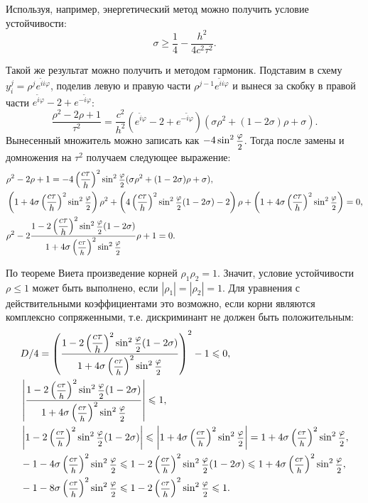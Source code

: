 \documentclass[12pt, a4paper]{article}
\begin{document}
\begin{enumerate}
	Используя, например, энергетический метод можно получить условие устойчивости\cite{galanin}:
	\[
	\sigma \ge \frac14 - \frac{h^2}{4 c^2 \tau^2}.
	\]
	
	Такой же результат можно получить и методом гармоник. Подставим в схему $y_i^j = \rho^j e^{\tilde i i \varphi}$, поделив левую и правую части $\rho^{j-1} e^{\tilde i i \varphi}$ и вынеся за скобку в правой части $e^{\tilde i \varphi} -2 + e^{-\tilde i \varphi}$:
	\[
	\dfrac{\rho^2 -2\rho + 1}{\tau^2} = \dfrac{c^2}{h^2}(e^{\tilde i \varphi} -2 + e^{-\tilde i \varphi}) (\sigma \rho^2 + (1-2\sigma)\rho+\sigma).
	\]
	Вынесенный множитель можно записать как $-4\sin^2\hbox{\footnotesize$\displaystyle\frac{\varphi}{2}$}$. Тогда после замены и домножения на $\tau^2$ получаем следующее выражение:
	\begin{eqnarray*}
		&\rho^2 -2\rho + 1 = -4 \left(\dfrac{c \tau}{h}\right)^2 \sin^2\hbox{\footnotesize$\displaystyle\frac{\varphi}{2}$} (\sigma \rho^2 + (1-2\sigma)\rho+\sigma),\\
		& \left(1+4\sigma\left(\dfrac{c \tau}{h}\right)^2 \sin^2\hbox{\footnotesize$\displaystyle\frac{\varphi}{2}$}\right)\rho^2 + \left(4 \left(\dfrac{c \tau}{h}\right)^2 \sin^2\hbox{\footnotesize$\displaystyle\frac{\varphi}{2}$}(1-2\sigma) - 2\right) \rho + \left(1+4\sigma\left(\dfrac{c \tau}{h}\right)^2 \sin^2\hbox{\footnotesize$\displaystyle\frac{\varphi}{2}$}\right) = 0,\\
		& \rho^2 - 2\dfrac{1- 2 \left(\dfrac{c \tau}{h}\right)^2 \sin^2\hbox{\footnotesize$\displaystyle\frac{\varphi}{2}$}(1-2\sigma)}{1+4\sigma\left(\hbox{\footnotesize$\displaystyle\frac{c \tau}{h}$}\right)^2 \sin^2\hbox{\footnotesize$\displaystyle\frac{\varphi}{2}$}}\rho + 1 =0.
	\end{eqnarray*}
	
	По теореме Виета произведение корней $\rho_1 \rho_2 = 1$. Значит, условие устойчивости $\rho \le 1$ может быть выполнено, если $|\rho_1|=|\rho_2|=1$. Для уравнения с действительными коэффициентами это возможно, если корни являются комплексно сопряженными, т.е. дискриминант не должен быть положительным:
	\begin{eqnarray*}
		&D/4 = \left(\dfrac{1- 2 \left(\dfrac{c \tau}{h}\right)^2 \sin^2\hbox{\footnotesize$\displaystyle\frac{\varphi}{2}$}(1-2\sigma)}{1+4\sigma\left(\hbox{\footnotesize$\displaystyle\frac{c \tau}{h}$}\right)^2 \sin^2\hbox{\footnotesize$\displaystyle\frac{\varphi}{2}$}}\right)^2 - 1 \leqslant 0,\\
		&\left|\dfrac{1- 2 \left(\hbox{\footnotesize$\displaystyle\frac{c \tau}{h}$}\right)^2 \sin^2\hbox{\footnotesize$\displaystyle\frac{\varphi}{2}$}(1-2\sigma)}{1+4\sigma\left(\hbox{\footnotesize$\displaystyle\frac{c \tau}{h}$}\right)^2 \sin^2\hbox{\footnotesize$\displaystyle\frac{\varphi}{2}$}}\right| \leqslant 1,\\
		&\left|1- 2 \left(\hbox{\footnotesize$\displaystyle\frac{c \tau}{h}$}\right)^2 \sin^2\hbox{\footnotesize$\displaystyle\frac{\varphi}{2}$}(1-2\sigma)\right| \leqslant \left|1+4\sigma\left(\hbox{\footnotesize$\displaystyle\frac{c \tau}{h}$}\right)^2 \sin^2\hbox{\footnotesize$\displaystyle\frac{\varphi}{2}$}\right| = 1+4\sigma\left(\hbox{\footnotesize$\displaystyle\frac{c \tau}{h}$}\right)^2 \sin^2\hbox{\footnotesize$\displaystyle\frac{\varphi}{2}$}, \\
		& -1 -4\sigma\left(\hbox{\footnotesize$\displaystyle\frac{c \tau}{h}$}\right)^2 \sin^2\hbox{\footnotesize$\displaystyle\frac{\varphi}{2}$} \leqslant 1- 2 \left(\hbox{\footnotesize$\displaystyle\frac{c \tau}{h}$}\right)^2 \sin^2\hbox{\footnotesize$\displaystyle\frac{\varphi}{2}$}(1-2\sigma) \leqslant 1 +4\sigma\left(\hbox{\footnotesize$\displaystyle\frac{c \tau}{h}$}\right)^2 \sin^2\hbox{\footnotesize$\displaystyle\frac{\varphi}{2}$},\\
		& -1 - 8\sigma\left(\hbox{\footnotesize$\displaystyle\frac{c \tau}{h}$}\right)^2 \sin^2\hbox{\footnotesize$\displaystyle\frac{\varphi}{2}$} \leqslant 1- 2 \left(\hbox{\footnotesize$\displaystyle\frac{c \tau}{h}$}\right)^2 \sin^2\hbox{\footnotesize$\displaystyle\frac{\varphi}{2}$} \leqslant 1. 
	\end{eqnarray*}
	

\end{enumerate}
\end{document}
